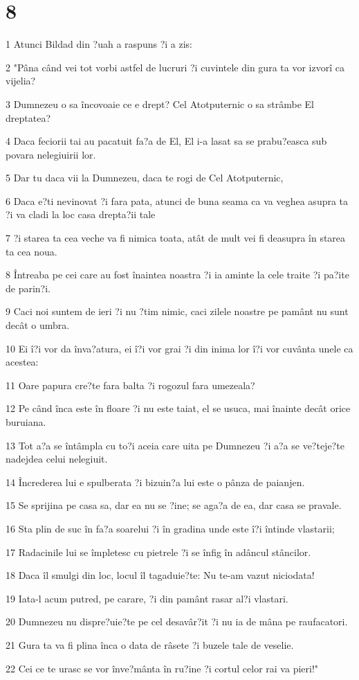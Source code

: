 \chapter{8}

\par 1 Atunci Bildad din ?uah a raspuns ?i a zis:
\par 2 "Pâna când vei tot vorbi astfel de lucruri ?i cuvintele din gura ta vor izvorî ca vijelia?
\par 3 Dumnezeu o sa încovoaie ce e drept? Cel Atotputernic o sa strâmbe El dreptatea?
\par 4 Daca feciorii tai au pacatuit fa?a de El, El i-a lasat sa se prabu?easca sub povara nelegiuirii lor.
\par 5 Dar tu daca vii la Dumnezeu, daca te rogi de Cel Atotputernic,
\par 6 Daca e?ti nevinovat ?i fara pata, atunci de buna seama ca va veghea asupra ta ?i va cladi la loc casa drepta?ii tale
\par 7 ?i starea ta cea veche va fi nimica toata, atât de mult vei fi deasupra în starea ta cea noua.
\par 8 Întreaba pe cei care au fost înaintea noastra ?i ia aminte la cele traite ?i pa?ite de parin?i.
\par 9 Caci noi suntem de ieri ?i nu ?tim nimic, caci zilele noastre pe pamânt nu sunt decât o umbra.
\par 10 Ei î?i vor da înva?atura, ei î?i vor grai ?i din inima lor î?i vor cuvânta unele ca acestea:
\par 11 Oare papura cre?te fara balta ?i rogozul fara umezeala?
\par 12 Pe când înca este în floare ?i nu este taiat, el se usuca, mai înainte decât orice buruiana.
\par 13 Tot a?a se întâmpla cu to?i aceia care uita pe Dumnezeu ?i a?a se ve?teje?te nadejdea celui nelegiuit.
\par 14 Încrederea lui e spulberata ?i bizuin?a lui este o pânza de paianjen.
\par 15 Se sprijina pe casa sa, dar ea nu se ?ine; se aga?a de ea, dar casa se pravale.
\par 16 Sta plin de suc în fa?a soarelui ?i în gradina unde este î?i întinde vlastarii;
\par 17 Radacinile lui se împletesc cu pietrele ?i se înfig în adâncul stâncilor.
\par 18 Daca îl smulgi din loc, locul îl tagaduie?te: Nu te-am vazut niciodata!
\par 19 Iata-l acum putred, pe carare, ?i din pamânt rasar al?i vlastari.
\par 20 Dumnezeu nu dispre?uie?te pe cel desavâr?it ?i nu ia de mâna pe raufacatori.
\par 21 Gura ta va fi plina înca o data de râsete ?i buzele tale de veselie.
\par 22 Cei ce te urasc se vor înve?mânta în ru?ine ?i cortul celor rai va pieri!"

